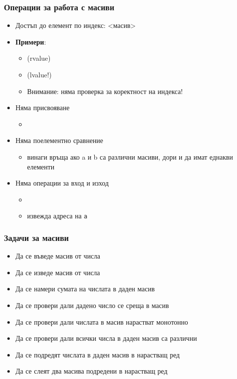 \documentclass{beamer}
\begin{document}
\begin{frame}
  \frametitle{Операции за работа с масиви}

  \begin{itemize}[<+->]
  \item Достъп до елемент по индекс: <масив>
  \item \textbf{Примери}:
    \begin{itemize}
    \item {} (\alert{rvalue})
    \item {} (\alert{lvalue!})
    \item \alert{Внимание: няма проверка за коректност на индекса!}
    \end{itemize}
  \item Няма присвояване
    \begin{itemize}
    \item {}
    \end{itemize}
  \item Няма поелементно сравнение
    \begin{itemize}
    \item {} винаги връща  ако \tta a и \tta b са различни масиви, дори и да имат еднакви елементи
    \end{itemize}
  \item Няма операции за вход и изход
    \begin{itemize}
    \item {}
    \item {} извежда адреса на \tt{a}
    \end{itemize}
  \end{itemize}
\end{frame}

\begin{frame}
  \frametitle{Задачи за масиви}

  \begin{itemize}[<+->]
    \item Да се въведе масив от числа
    \item Да се изведе масив от числа
    \item Да се намери сумата на числата в даден масив
    \item Да се провери дали дадено число се среща в масив
    \item Да се провери дали числата в масив нарастват монотонно
    \item Да се провери дали всички числа в даден масив са различни
    \item Да се подредят числата в даден масив в нарастващ ред
    \item Да се слеят два масива подредени в нарастващ ред
  \end{itemize}
\end{frame}
\end{document}
